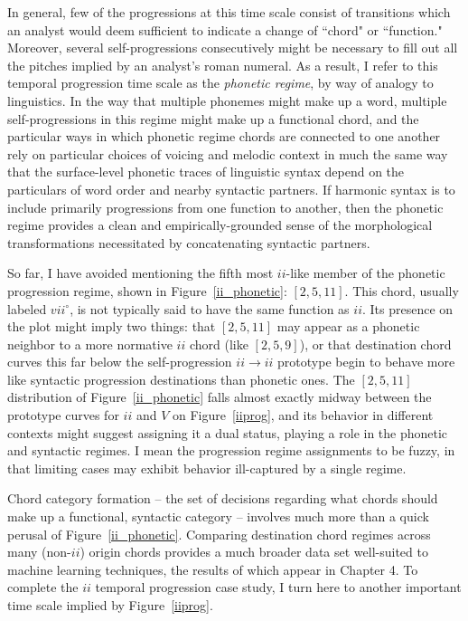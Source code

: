 In general, few of the progressions at this time scale consist of transitions which an analyst would deem sufficient to indicate a change of ``chord" or ``function."  Moreover, several self-progressions consecutively might be necessary to fill out all the pitches implied by an analyst's roman numeral.  As a result, I refer to this temporal progression time scale as the \emph{phonetic regime}, by way of analogy to linguistics.  In the way that multiple phonemes might make up a word, multiple self-progressions in this regime might make up a functional chord, and the particular ways in which phonetic regime chords are connected to one another rely on particular choices of voicing and melodic context in much the same way that the surface-level phonetic traces of linguistic syntax depend on the particulars of word order and nearby syntactic partners.  If harmonic syntax is to include primarily progressions from one function to another, then the phonetic regime provides a clean and empirically-grounded sense of the morphological transformations necessitated by concatenating syntactic partners. 

So far, I have avoided mentioning the fifth most $ii$-like member of the phonetic progression regime, shown in Figure~\ref{ii_phonetic}: $[2,5,11]$.  This chord, usually labeled $vii^{\circ}$, is not typically said to have the same function as $ii$.  Its presence on the plot might imply two things: that $[2,5,11]$ may appear as a phonetic neighbor to a more normative $ii$ chord (like $[2,5,9]$), or that destination chord curves this far below the self-progression $ii \rightarrow ii$ prototype begin to behave more like syntactic progression destinations than phonetic ones.  The $[2,5,11]$ distribution of Figure~\ref{ii_phonetic} falls almost exactly midway between the prototype curves for $ii$ and $V$ on Figure~\ref{iiprog}, and its behavior in different contexts might suggest assigning it a dual status, playing a role in the phonetic and syntactic regimes.  I mean the progression regime assignments to be fuzzy, in that limiting cases may exhibit behavior ill-captured by a single regime.

Chord category formation -- the set of decisions regarding what chords should make up a functional, syntactic category -- involves much more than a quick perusal of Figure~\ref{ii_phonetic}.  Comparing destination chord regimes across many (non-$ii$) origin chords provides a much broader data set well-suited to machine learning techniques, the results of which appear in Chapter 4.  To complete the $ii$ temporal progression case study, I turn here to another important time scale implied by Figure~\ref{iiprog}.

